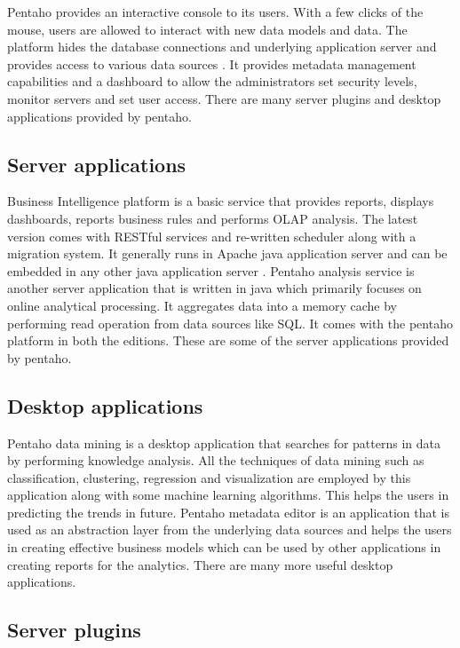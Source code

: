 \documentclass[9pt,twocolumn,twoside]{styles/osajnl}
\begin{document}
Pentaho provides an interactive console to its users. With a few
clicks of the mouse, users are allowed to interact with new data
models and data. The platform hides the database connections and
underlying application server and provides access to various data
sources \cite{pent3}. It provides metadata management capabilities and
a dashboard to allow the administrators set security levels, monitor
servers and set user access. There are many server plugins and desktop
applications provided by pentaho.

\subsection{Server applications}

Business Intelligence platform is a basic service that provides
reports, displays dashboards, reports business rules and performs OLAP
analysis. The latest version comes with RESTful services and
re-written scheduler along with a migration system. It generally runs
in Apache java application server and can be embedded in any other
java application server \cite{pent1}. Pentaho analysis service is
another server application that is written in java which primarily
focuses on online analytical processing. It aggregates data into a
memory cache by performing read operation from data sources like
SQL. It comes with the pentaho platform in both the editions. These
are some of the server applications provided by pentaho.

\subsection{Desktop applications}

Pentaho data mining is a desktop application that searches for
patterns in data by performing knowledge analysis. All the techniques
of data mining such as classification, clustering, regression and
visualization are employed by this application along with some machine
learning algorithms. This helps the users in predicting the trends in
future. Pentaho metadata editor is an application that is used as an
abstraction layer from the underlying data sources and helps the users
in creating effective business models which can be used by other
applications in creating reports for the analytics. There are many
more useful desktop applications.
 
\subsection{Server plugins}
\end{document}
